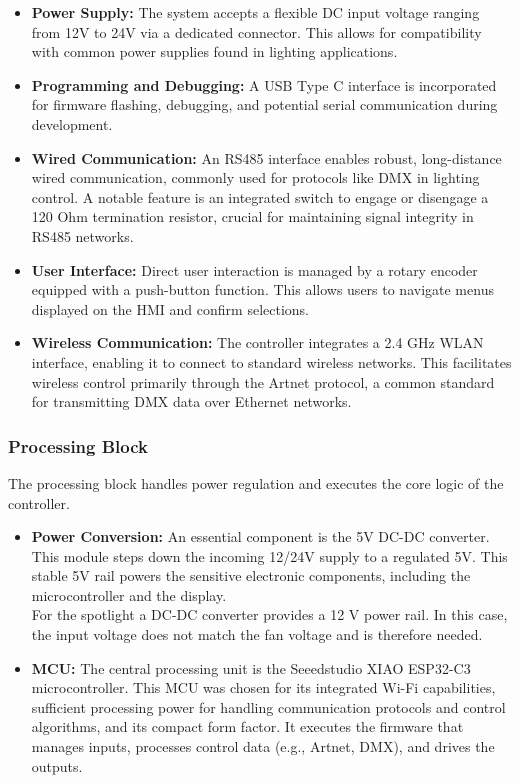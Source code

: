 \begin{itemize}
	\item \textbf{Power Supply:} The system accepts a flexible \ac{DC} input voltage ranging from 12V to 24V via a dedicated connector. This allows for compatibility with common power supplies found in lighting applications.
	\item \textbf{Programming and Debugging:} A \ac{USB} Type C interface is incorporated for firmware flashing, debugging, and potential serial communication during development.
	\item \textbf{Wired Communication:} An \ac{RS485} interface enables robust, long-distance wired communication, commonly used for protocols like \ac{DMX} in lighting control. A notable feature is an integrated switch to engage or disengage a 120 Ohm termination resistor, crucial for maintaining signal integrity in \ac{RS485} networks.
	\item \textbf{User Interface:} Direct user interaction is managed by a rotary encoder equipped with a push-button function. This allows users to navigate menus displayed on the \ac{HMI} and confirm selections.
	\item \textbf{Wireless Communication:} The controller integrates a 2.4 GHz \ac{WLAN} interface, enabling it to connect to standard wireless networks. This facilitates wireless control primarily through the Artnet protocol, a common standard for transmitting \ac{DMX} data over Ethernet networks.
\end{itemize}

\subsubsection*{Processing Block}

The processing block handles power regulation and executes the core logic of the controller.

\begin{itemize}
	\item \textbf{Power Conversion:} An essential component is the 5V DC-DC converter. This module steps down the incoming 12/24V supply to a regulated 5V. This stable 5V rail powers the sensitive electronic components, including the microcontroller and the display. \\
	For the spotlight a DC-DC converter provides a 12 V power rail. In this case, the input voltage does not match the fan voltage and is therefore needed. 
	\item \textbf{\ac{MCU}:} The central processing unit is the Seeedstudio XIAO ESP32-C3 microcontroller. This \ac{MCU} was chosen for its integrated Wi-Fi capabilities, sufficient processing power for handling communication protocols and control algorithms, and its compact form factor. It executes the firmware that manages inputs, processes control data (e.g., Artnet, \ac{DMX}), and drives the outputs.
\end{itemize}

